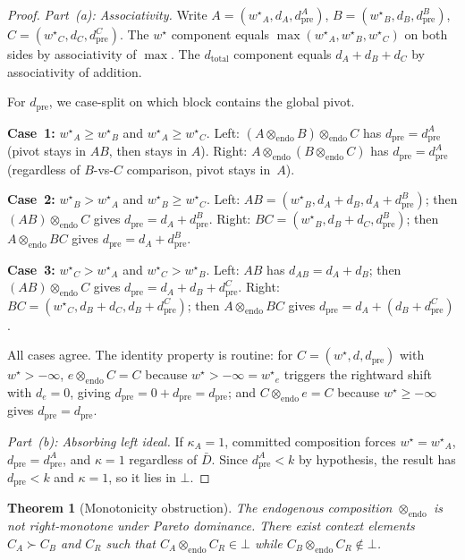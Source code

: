 \documentclass[11pt]{article}
\theoremstyle{plain}
\newtheorem{theorem}{Theorem}[section]
\theoremstyle{definition}
\theoremstyle{remark}
\newcommand{\opendo}{\otimes_{\mathrm{endo}}}
\newcommand{\absorb}{\bot}
\newcommand{\wstar}{{w^{\star}}}
\newcommand{\dtotal}{{d_{\mathrm{total}}}}
\newcommand{\dpre}[1][]{d_{\mathrm{pre}#1}}
\begin{document}
\begin{proof}
\emph{Part~(a): Associativity.}  Write $A = (\wstar_A, d_A, \dpre^A)$,
$B = (\wstar_B, d_B, \dpre^B)$, $C = (\wstar_C, d_C, \dpre^C)$.  The
$\wstar$ component equals
$\max(\wstar_A, \wstar_B, \wstar_C)$ on both sides by associativity
of $\max$.  The $\dtotal$ component equals $d_A + d_B + d_C$ by
associativity of addition.

For $\dpre$, we case-split on which block contains the global pivot.

\textbf{Case~1:} $\wstar_A \ge \wstar_B$ and $\wstar_A \ge \wstar_C$.
Left: $(A \opendo B) \opendo C$ has $\dpre = \dpre^A$ (pivot stays in
$AB$, then stays in $A$).
Right: $A \opendo (B \opendo C)$ has $\dpre = \dpre^A$ (regardless of
$B$-vs-$C$ comparison, pivot stays in~$A$).

\textbf{Case~2:} $\wstar_B > \wstar_A$ and $\wstar_B \ge \wstar_C$.
Left: $AB = (\wstar_B, d_A{+}d_B, d_A{+}\dpre^B)$; then
$(AB) \opendo C$ gives $\dpre = d_A + \dpre^B$.
Right: $BC = (\wstar_B, d_B{+}d_C, \dpre^B)$; then
$A \opendo BC$ gives $\dpre = d_A + \dpre^B$.

\textbf{Case~3:} $\wstar_C > \wstar_A$ and $\wstar_C > \wstar_B$.
Left: $AB$ has $d_{AB} = d_A + d_B$; then
$(AB) \opendo C$ gives $\dpre = d_A + d_B + \dpre^C$.
Right: $BC = (\wstar_C, d_B{+}d_C, d_B{+}\dpre^C)$; then
$A \opendo BC$ gives $\dpre = d_A + (d_B + \dpre^C)$.

All cases agree.  The identity property is routine: for $C = (\wstar,
d, \dpre)$ with $\wstar > -\infty$,
$e \opendo C = C$ because $\wstar > -\infty = \wstar_e$ triggers the
rightward shift with $d_e = 0$, giving $\dpre = 0 + \dpre = \dpre$; and
$C \opendo e = C$ because $\wstar \ge -\infty$ gives $\dpre = \dpre$.

\emph{Part~(b): Absorbing left ideal.}  If $\kappa_A = 1$, committed
composition forces $\wstar = \wstar_A$, $\dpre = \dpre^A$, and
$\kappa = 1$ regardless of $\bar{D}$.  Since $\dpre^A < k$ by
hypothesis, the result has $\dpre < k$ and $\kappa = 1$, so it lies
in $\absorb$.
\end{proof}

\begin{theorem}[Monotonicity obstruction]\label{thm:monotonicity-obstruction}
The endogenous composition $\opendo$ is not right-monotone under Pareto
dominance.  There exist context elements $C_A \succ C_B$ and $C_R$ such
that $C_A \opendo C_R \in \absorb$ while $C_B \opendo C_R \notin \absorb$.
\end{theorem}
\end{document}
